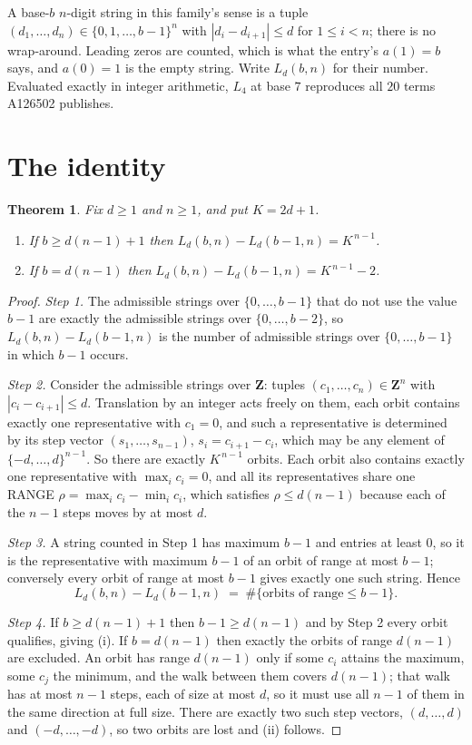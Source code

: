 \documentclass[11pt,a4paper]{article}
\theoremstyle{plain}
\newtheorem{theorem}{Theorem}
\theoremstyle{definition}
\begin{document}
A base-$b$ $n$-digit string in this family's sense is a tuple
$(d_1,\dots,d_n)\in\{0,1,\dots,b-1\}^{n}$ with $|d_i-d_{i+1}|\le d$ for $1\le i<n$; there
is no wrap-around. Leading zeros are counted, which is what the entry's $a(1)=b$ says, and
$a(0)=1$ is the empty string. Write $L_d(b,n)$ for their number. Evaluated exactly in integer
arithmetic, $L_{4}$ at base $7$ reproduces all $20$ terms A126502 publishes.

\section{The identity}

\begin{theorem}
Fix $d\ge1$ and $n\ge1$, and put $K=2d+1$.
\begin{enumerate}
\item[(i)] If $b\ge d(n-1)+1$ then $L_d(b,n)-L_d(b-1,n)=K^{\,n-1}$.
\item[(ii)] If $b=d(n-1)$ then $L_d(b,n)-L_d(b-1,n)=K^{\,n-1}-2$.
\end{enumerate}
\end{theorem}

\begin{proof}
\emph{Step 1.} The admissible strings over $\{0,\dots,b-1\}$ that do not use the value $b-1$
are exactly the admissible strings over $\{0,\dots,b-2\}$, so $L_d(b,n)-L_d(b-1,n)$ is the
number of admissible strings over $\{0,\dots,b-1\}$ in which $b-1$ occurs.

\emph{Step 2.} Consider the admissible strings over $\mathbf{Z}$: tuples
$(c_1,\dots,c_n)\in\mathbf{Z}^{n}$ with $|c_i-c_{i+1}|\le d$. Translation by an integer acts
freely on them, each orbit contains exactly one representative with $c_1=0$, and such a
representative is determined by its step vector $(s_1,\dots,s_{n-1})$, $s_i=c_{i+1}-c_i$,
which may be any element of $\{-d,\dots,d\}^{n-1}$. So there are exactly $K^{\,n-1}$ orbits.
Each orbit also contains exactly one representative with $\max_i c_i=0$, and all its
representatives share one RANGE $\rho=\max_ic_i-\min_ic_i$, which satisfies
$\rho\le d(n-1)$ because each of the $n-1$ steps moves by at most $d$.

\emph{Step 3.} A string counted in Step 1 has maximum $b-1$ and entries at least $0$, so it is
the representative with maximum $b-1$ of an orbit of range at most $b-1$; conversely every orbit
of range at most $b-1$ gives exactly one such string. Hence
\[
L_d(b,n)-L_d(b-1,n)\;=\;\#\{\text{orbits of range}\le b-1\} .
\]

\emph{Step 4.} If $b\ge d(n-1)+1$ then $b-1\ge d(n-1)$ and by Step 2 every orbit qualifies,
giving (i). If $b=d(n-1)$ then exactly the orbits of range $d(n-1)$ are excluded. An orbit has
range $d(n-1)$ only if some $c_i$ attains the maximum, some $c_j$ the minimum, and the walk
between them covers $d(n-1)$; that walk has at most $n-1$ steps, each of size at most $d$, so it
must use all $n-1$ of them in the same direction at full size. There are exactly two such step
vectors, $(d,\dots,d)$ and $(-d,\dots,-d)$, so two orbits are lost and (ii) follows.
\end{proof}
\end{document}
